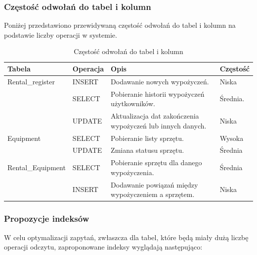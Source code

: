 \documentclass{article}
\begin{document}
\subsubsection{\textbf{Częstość odwołań do tabel i kolumn}}
Poniżej przedstawiono przewidywaną częstość odwołań do tabel i kolumn na podstawie liczby operacji w systemie.

\begin{table}[h!]
    \centering
        \begin{tabular}[width=\textwidth]{|l|l|p{5cm}|l|}
            \hline
            \textbf{Tabela} & \textbf{Operacja} & \textbf{Opis} & \textbf{Częstość} \\ \hline
            Rental\_register& INSERT  & Dodawanie nowych wypożyczeń. & Niska  \\ \hline
             ~ & SELECT & Pobieranie historii wypożyczeń użytkowników. & Średnia. \\ \hline
             ~ & UPDATE & Aktualizacja dat zakończenia wypożyczeń lub innych danych. & Niska \\ \hline
            Equipment & SELECT & Pobieranie listy sprzętu. & Wysoka  \\ \hline
              & UPDATE & Zmiana statusu sprzętu. & Średnia \\ \hline
            Rental\_Equipment & SELECT & Pobieranie sprzętu dla danego wypożyczenia. & Średnia \\ \hline
              & INSERT & Dodawanie powiązań między wypożyczeniem a sprzętem. & Niska \\ \hline
        \end{tabular}
    \caption{Częstość odwołań do tabel i kolumn}
\end{table}

\subsubsection{Propozycje indeksów}
W celu optymalizacji zapytań, zwłaszcza dla tabel, które będą miały dużą liczbę operacji odczytu, zaproponowane indeksy wyglądają następująco:
\end{document}
